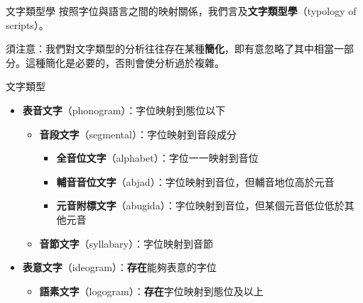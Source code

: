 \documentclass[aspectratio=169]{beamer}
\begin{document}
\begin{frame}{文字類型學}
    按照字位與語言之間的映射關係，我們言及\textbf{文字類型學}（typology of scripts）。

    須注意：我們對文字類型的分析往往存在某種\textbf{簡化}，即有意忽略了其中相當一部分。這種簡化是必要的，否則會使分析過於複雜。

    \begin{block}{文字類型}
        \begin{itemize}
            \item \textbf{表音文字}（phonogram）：字位映射到態位以下
            \begin{itemize}
                \item \textbf{音段文字}（segmental）：字位映射到音段成分
                \begin{itemize}
                    \item \textbf{全音位文字}（alphabet）：字位一一映射到音位
                    \item \textbf{輔音音位文字}（abjad）：字位映射到音位，但輔音地位高於元音
                    \item \textbf{元音附標文字}（abugida）：字位映射到音位，但某個元音低位低於其他元音
                \end{itemize}
                \item \textbf{音節文字}（syllabary）：字位映射到音節
            \end{itemize}
            \item \textbf{表意文字}（ideogram）：\textbf{存在}能夠表意的字位
            \begin{itemize}
                \item \textbf{語素文字}（logogram）：\textbf{存在}字位映射到態位及以上
            \end{itemize}
        \end{itemize}
    \end{block}
\end{frame}
\end{document}

